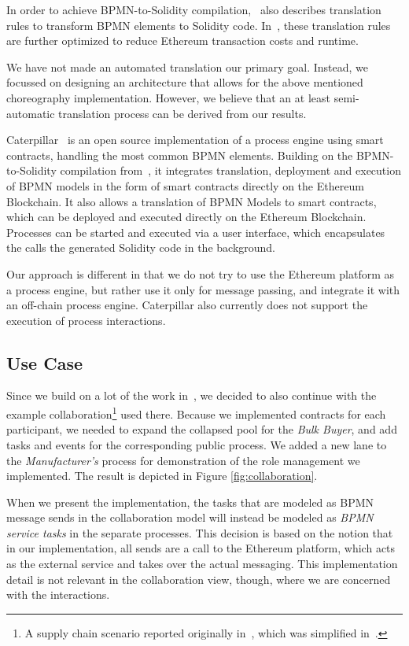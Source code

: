 \documentclass[runningheads]{llncs}
\begin{document}
In order to achieve BPMN-to-Solidity compilation,~\cite{weber2016untrusted} also describes translation rules to transform BPMN elements to Solidity code.
In~\cite{banuelos2017optimized}, these translation rules are further optimized to reduce Ethereum transaction costs and runtime. %

We have not made an automated translation our primary goal.
Instead, we focussed on designing an architecture that allows for the above mentioned choreography implementation.
However, we believe that an at least semi-automatic translation process can be derived from our results.

Caterpillar~\cite{lopez2017caterpillar} is an open source implementation of a process engine using smart contracts, handling the most common BPMN elements.
Building on the BPMN-to-Solidity compilation from~\cite{weber2016untrusted}, it integrates translation, deployment and execution of BPMN models in the form of smart contracts directly on the Ethereum Blockchain.
It also allows a translation of BPMN Models to smart contracts, which can be deployed and executed directly on the Ethereum Blockchain.
Processes can be started and executed via a user interface, which encapsulates the calls the generated Solidity code in the background.

Our approach is different in that we do not try to use the Ethereum platform as a process engine, but rather use it only for message passing, and integrate it with an off-chain process engine.
Caterpillar also currently does not support the execution of process interactions.

\subsection{Use Case}

Since we build on a lot of the work in~\cite{weber2016untrusted}, we decided to also continue with the example collaboration\footnote{A supply chain scenario reported originally in~\cite{fdhila2015collaborative}, which was simplified in~\cite{weber2016untrusted}.} used there.
Because we implemented contracts for each participant, we needed to expand the collapsed pool for the \emph{Bulk Buyer}, and add tasks and events for the corresponding public process.
We added a new lane to the \emph{Manufacturer's} process for demonstration of the role management we implemented.
The result is depicted in Figure \ref{fig:collaboration}.

When we present the implementation, the tasks that are modeled as BPMN message sends in the collaboration model will instead be modeled as \emph{BPMN service tasks} in the separate processes.
This decision is based on the notion that in our implementation, all sends are a call to the Ethereum platform, which acts as the external service and takes over the actual messaging.
This implementation detail is not relevant in the collaboration view, though, where we are concerned with the interactions.
\end{document}
